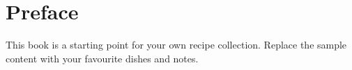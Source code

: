 \chapter*{Preface}
This book is a starting point for your own recipe collection. Replace the sample content with your favourite dishes and notes.
